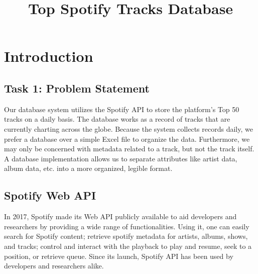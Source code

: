 \documentclass[conference]{IEEEtran}
\begin{document}
\title{Top Spotify Tracks Database}

\author{
\and
{}
\and
{}
}
\maketitle

\begin{abstract}

\end{abstract}

\section{Introduction}
\subsection{\textbf{Task 1}: Problem Statement}
Our database system utilizes the Spotify API \cite{b1} to store the platform’s Top 50 tracks on a daily basis. The database works as a record of tracks that are currently charting across the globe. Because the system collects records daily, we prefer a database over a simple Excel file to organize the data. Furthermore, we may only be concerned with metadata related to a track, but not the track itself. A database implementation allows us to separate attributes like artist data, album data, etc. into a more organized, legible format.

\subsection{Spotify Web API \cite{b1}}
In 2017, Spotify made its Web API publicly available to aid developers and researchers by providing a wide range of functionalities. Using it, one can easily search for Spotify content; retrieve spotify metadata for artists, albums, shows, and tracks; control and interact with the playback to play and resume, seek to a position, or retrieve queue. Since its launch, Spotify API has been used by developers and researchers alike. 
\end{document}
